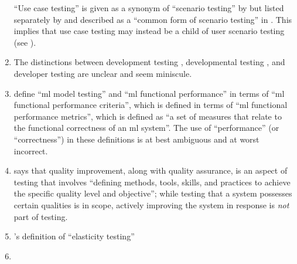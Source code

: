 \begin{enumerate}
          ``Use case testing'' is given as a synonym of ``scenario testing''
          by \citetISTQB{}
          but listed separately by
          \citet[Fig.~2]{IEEE2022} and described as a ``common form of scenario
          testing'' in \citeyearpar[p.~20]{IEEE2021b}.
          This implies that use case testing may instead be a child of
          user scenario testing (see ).
    \item %
          The distinctions between development testing \citep[p.~136]{IEEE2017},
          developmental testing \citep[p.~30]{Firesmith2015}, and developer
          testing \citep[p.~39;][p.~11]{Gerrard2000a} are unclear and seem
          miniscule.
    \item %
          \citetISTQB{} define
          ``\acf{ml} model testing'' and ``\acs{ml} functional performance''
          in terms of ``\acs{ml} functional performance criteria'',
          which is defined in terms of ``\acs{ml} functional performance
          metrics'', which is defined as ``a set of measures that relate to the
          functional correctness of an \acs{ml} system''. The use
          of ``performance'' (or ``correctness'') in these definitions is at
          best ambiguous and at worst incorrect.
    \item %
          \citet[p.~5\=/4]{SWEBOK2024} says that quality improvement,
          along with quality assurance, is an aspect of testing that involves
          ``defining methods, tools, skills, and practices to achieve the
          specific quality level and objective''; while testing that a system
          possesses certain qualities is in scope, actively improving the
          system in response is \emph{not} part of testing.
    \item %
          \citet[p.~5\=/9]{SWEBOK2024}'s definition of
          ``elasticity testing'' \swebokElasRef{}
    \item %

\end{enumerate}
